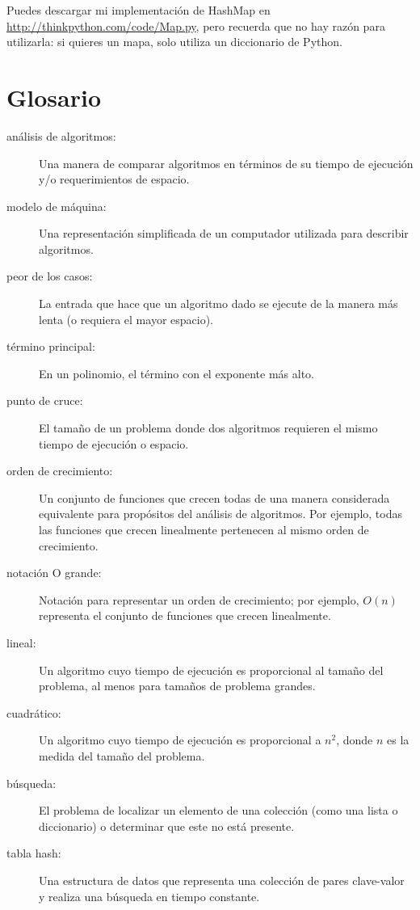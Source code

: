 \documentclass[10pt]{book}
\begin{document}
Puedes descargar mi implementación de HashMap en
\url{http://thinkpython.com/code/Map.py}, pero recuerda que no hay
razón para utilizarla: si quieres un mapa, solo utiliza un diccionario de Python.

\section{Glosario}

\begin{description}

\item[análisis de algoritmos:] Una manera de comparar algoritmos en términos de
su tiempo de ejecución y/o requerimientos de espacio.

\item[modelo de máquina:] Una representación simplificada de un computador utilizada
para describir algoritmos.

\item[peor de los casos:] La entrada que hace que un algoritmo dado se ejecute de la manera más lenta (o
requiera el mayor espacio).

\item[término principal:] En un polinomio, el término con el exponente más alto.

\item[punto de cruce:] El tamaño de un problema donde dos algoritmos requieren
el mismo tiempo de ejecución o espacio.

\item[orden de crecimiento:] Un conjunto de funciones que crecen todas de una manera
considerada equivalente para propósitos del análisis de algoritmos.
Por ejemplo, todas las funciones que crecen linealmente pertenecen al mismo
orden de crecimiento.

\item[notación O grande:] Notación para representar un orden de crecimiento;
por ejemplo, $O(n)$ representa el conjunto de funciones que crecen
linealmente.

\item[lineal:] Un algoritmo cuyo tiempo de ejecución es proporcional al
tamaño del problema, al menos para tamaños de problema grandes.

\item[cuadrático:] Un algoritmo cuyo tiempo de ejecución es proporcional a
$n^2$, donde $n$ es la medida del tamaño del problema.

\item[búsqueda:] El problema de localizar un elemento de una colección
(como una lista o diccionario) o determinar que este no está presente.

\item[tabla hash:] Una estructura de datos que representa una colección de
pares clave-valor y realiza una búsqueda en tiempo constante.

\end{description}


\printindex

\clearemptydoublepage
\end{document}
